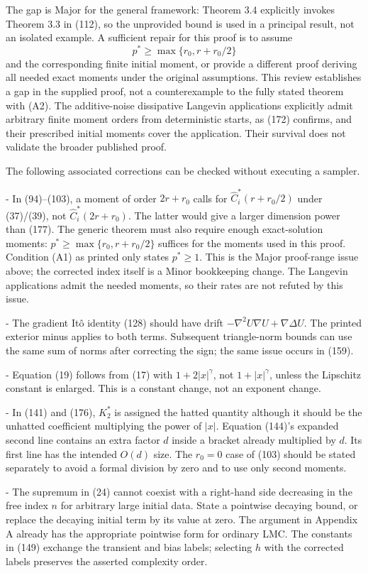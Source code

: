 \documentclass[10pt]{article}
\begin{document}
The gap is Major for the general framework: Theorem 3.4 explicitly invokes Theorem 3.3 in (112), so the unprovided bound is used in a principal result, not an isolated example. A sufficient repair for this proof is to assume \[p^*\ge\max\{r_0,r+r_0/2\}\] and the corresponding finite initial moment, or provide a different proof deriving all needed exact moments under the original assumptions. This review establishes a gap in the supplied proof, not a counterexample to the fully stated theorem with (A2). The additive-noise dissipative Langevin applications explicitly admit arbitrary finite moment orders from deterministic starts, as (172) confirms, and their prescribed initial moments cover the application. Their survival does not validate the broader published proof.\par
The following associated corrections can be checked without executing a sampler.\par
- In (94)–(103), a moment of order \(2r+r_0\) calls for \(\widehat C_i^*(r+r_0/2)\) under (37)/(39), not \(\widehat C_i^*(2r+r_0)\). The latter would give a larger dimension power than (177). The generic theorem must also require enough exact-solution moments: \(p^*\ge\max\{r_0,r+r_0/2\}\) suffices for the moments used in this proof. Condition (A1) as printed only states \(p^*\ge1\). This is the Major proof-range issue above; the corrected index itself is a Minor bookkeeping change. The Langevin applications admit the needed moments, so their rates are not refuted by this issue.\par
- The gradient Itô identity (128) should have drift \(-\nabla^2U\nabla U+\nabla\Delta U\). The printed exterior minus applies to both terms. Subsequent triangle-norm bounds can use the same sum of norms after correcting the sign; the same issue occurs in (159).\par
- Equation (19) follows from (17) with \(1+2|x|^\gamma\), not \(1+|x|^\gamma\), unless the Lipschitz constant is enlarged. This is a constant change, not an exponent change.\par
- In (141) and (176), \(K_2^*\) is assigned the hatted quantity although it should be the unhatted coefficient multiplying the power of \(|x|\). Equation (144)’s expanded second line contains an extra factor \(d\) inside a bracket already multiplied by \(d\). Its first line has the intended \(O(d)\) size. The \(r_0=0\) case of (103) should be stated separately to avoid a formal division by zero and to use only second moments.\par
- The supremum in (24) cannot coexist with a right-hand side decreasing in the free index \(n\) for arbitrary large initial data. State a pointwise decaying bound, or replace the decaying initial term by its value at zero. The argument in Appendix A already has the appropriate pointwise form for ordinary LMC. The constants in (149) exchange the transient and bias labels; selecting \(h\) with the corrected labels preserves the asserted complexity order.\par
\end{document}
